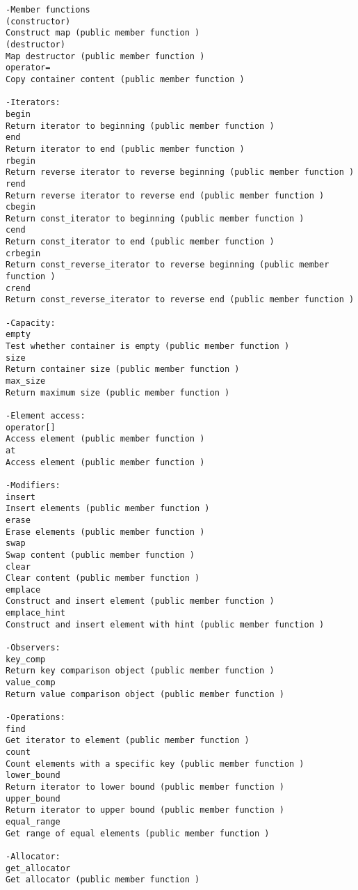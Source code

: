 \begin{verbatim}
-Member functions
(constructor)
Construct map (public member function )
(destructor)
Map destructor (public member function )
operator=
Copy container content (public member function )

-Iterators:
begin
Return iterator to beginning (public member function )
end
Return iterator to end (public member function )
rbegin
Return reverse iterator to reverse beginning (public member function )
rend
Return reverse iterator to reverse end (public member function )
cbegin 
Return const_iterator to beginning (public member function )
cend 
Return const_iterator to end (public member function )
crbegin 
Return const_reverse_iterator to reverse beginning (public member function )
crend 
Return const_reverse_iterator to reverse end (public member function )

-Capacity:
empty
Test whether container is empty (public member function )
size
Return container size (public member function )
max_size
Return maximum size (public member function )

-Element access:
operator[]
Access element (public member function )
at 
Access element (public member function )

-Modifiers:
insert
Insert elements (public member function )
erase
Erase elements (public member function )
swap
Swap content (public member function )
clear
Clear content (public member function )
emplace 
Construct and insert element (public member function )
emplace_hint 
Construct and insert element with hint (public member function )

-Observers:
key_comp
Return key comparison object (public member function )
value_comp
Return value comparison object (public member function )

-Operations:
find
Get iterator to element (public member function )
count
Count elements with a specific key (public member function )
lower_bound
Return iterator to lower bound (public member function )
upper_bound
Return iterator to upper bound (public member function )
equal_range
Get range of equal elements (public member function )

-Allocator:
get_allocator
Get allocator (public member function )

\end{verbatim}